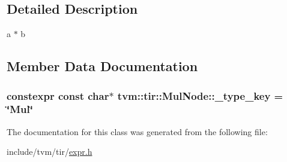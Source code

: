 \subsection{Detailed Description}
a $\ast$ b 

\subsection{Member Data Documentation}
\subsubsection[{\texorpdfstring{\+\_\+type\+\_\+key}{_type_key}}]{\setlength{\rightskip}{0pt plus 5cm}constexpr const char$\ast$ tvm\+::tir\+::\+Mul\+Node\+::\+\_\+type\+\_\+key = \char`\"{}Mul\char`\"{}\hspace{0.3cm}{\ttfamily [static]}}\hypertarget{classtvm_1_1tir_1_1MulNode_ab8b1b845628226529c395872c18e1b40}{}\label{classtvm_1_1tir_1_1MulNode_ab8b1b845628226529c395872c18e1b40}


The documentation for this class was generated from the following file\+:\begin{DoxyCompactItemize}
\item 
include/tvm/tir/\hyperlink{tir_2expr_8h}{expr.\+h}\end{DoxyCompactItemize}
